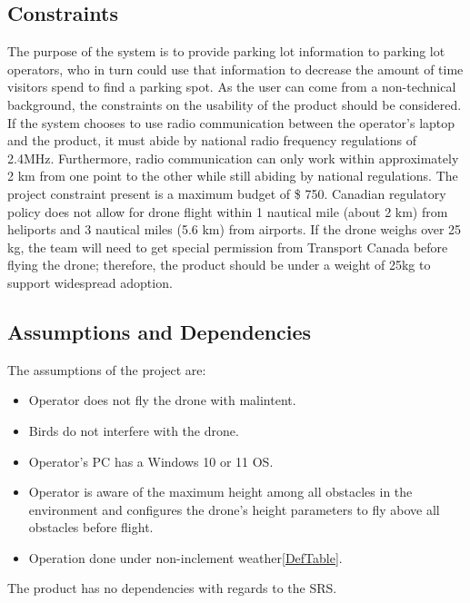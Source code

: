 \documentclass{article}
\begin{document}
\subsection{Constraints}
\label{sec:Constraints}
The purpose of the system is to provide parking lot information to parking lot operators, who in turn could use that information to decrease the amount of time visitors spend to find a parking spot. As the user can come from a non-technical background, the constraints on the usability of the product should be considered. If the system chooses to use radio communication between the operator's laptop and the product, it must abide by national radio frequency regulations of 2.4MHz. Furthermore, radio communication can only work within approximately 2 km from one point to the other while still abiding by national regulations. The project constraint present is a maximum budget of \$ 750.  Canadian regulatory policy does not allow for drone flight within 1 nautical mile (about 2 km) from heliports and 3 nautical miles (5.6 km) from airports\cite{canada_flying_2020}. If the drone weighs over 25 kg, the team will need to get special permission from Transport Canada before flying the drone\cite{canada_find_2021}; therefore, the product should be under a weight of 25kg to support widespread adoption.
\subsection{Assumptions and Dependencies}
\label{sec:Assumptions}
The assumptions of the project are:
\begin{itemize}

  \item Operator does not fly the drone with malintent.
  \item Birds do not interfere with the drone.
  \item Operator's PC has a Windows 10 or 11 OS.
  \item Operator is aware of the maximum height among all obstacles in the environment and configures the drone's height parameters to fly above all obstacles before flight.
  \item Operation done under non-inclement weather\ref{DefTable}. 

\end{itemize}

The product has no dependencies with regards to the SRS.
\end{document}
